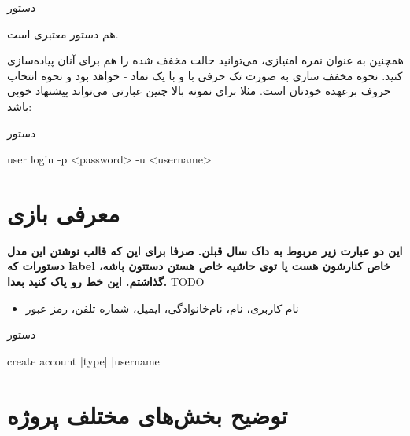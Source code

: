 \documentclass[]{article}
\begin{document}
\begin{enumerate}[label={نکته \arabic*:}]
\begin{mybox}[colback=yellow]{دستور}
\end{mybox}

هم دستور معتبری است.

همچنین به عنوان نمره امتیازی، می‌توانید حالت مخفف شده را هم برای آنان پیاده‌سازی کنید. نحوه مخفف سازی به صورت تک حرفی با و با یک نماد -
خواهد بود و نحوه انتخاب حروف برعهده خودتان است. مثلا برای نمونه بالا چنین عبارتی می‌تواند پیشنهاد خوبی باشد:

\begin{mybox}[colback=yellow]{دستور}
	
	
	\begin{latin}
		
		user login -p <password> -u <username> 
		
	\end{latin}
	
\end{mybox}


\end{enumerate}




\newpage


\section*{{\titr معرفی بازی}}


\textbf{این دو عبارت زیر مربوط به داک سال قبلن. صرفا برای این که قالب نوشتن این مدل دستورات که label خاص کنارشون هست یا توی حاشیه خاص هستن دستتون باشه، گذاشتم. این خط رو پاک کنید بعدا. }TODO

\begin{itemize}[label=$\blacksquare$]
	\item
	نام کاربری، نام، نام‌خانوادگی، ایمیل، شماره تلفن، رمز عبور 
\end{itemize}



\begin{mybox}[colback=yellow]{دستور}
	
	
	\begin{latin}
		
		create account [type] [username]
		
	\end{latin}
	
\end{mybox}

\section*{{\titr توضیح بخش‌های مختلف پروژه}}
\end{document}
